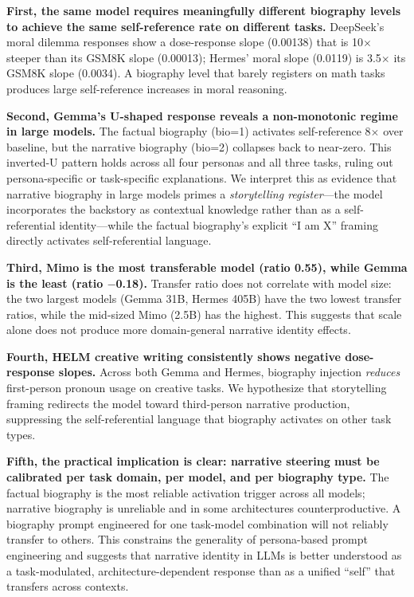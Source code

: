 \documentclass[11pt,a4paper]{article}
\begin{document}
\textbf{First, the same model requires meaningfully different biography levels to achieve the same self-reference rate on different tasks.} DeepSeek's moral dilemma responses show a dose-response slope (0.00138) that is 10$\times$ steeper than its GSM8K slope (0.00013); Hermes' moral slope (0.0119) is 3.5$\times$ its GSM8K slope (0.0034). A biography level that barely registers on math tasks produces large self-reference increases in moral reasoning.

\textbf{Second, Gemma's U-shaped response reveals a non-monotonic regime in large models.} The factual biography (bio=1) activates self-reference 8$\times$ over baseline, but the narrative biography (bio=2) collapses back to near-zero. This inverted-U pattern holds across all four personas and all three tasks, ruling out persona-specific or task-specific explanations. We interpret this as evidence that narrative biography in large models primes a \textit{storytelling register}---the model incorporates the backstory as contextual knowledge rather than as a self-referential identity---while the factual biography's explicit ``I am X'' framing directly activates self-referential language.

\textbf{Third, Mimo is the most transferable model (ratio 0.55), while Gemma is the least (ratio $-$0.18).} Transfer ratio does not correlate with model size: the two largest models (Gemma 31B, Hermes 405B) have the two lowest transfer ratios, while the mid-sized Mimo (2.5B) has the highest. This suggests that scale alone does not produce more domain-general narrative identity effects.

\textbf{Fourth, HELM creative writing consistently shows negative dose-response slopes.} Across both Gemma and Hermes, biography injection \textit{reduces} first-person pronoun usage on creative tasks. We hypothesize that storytelling framing redirects the model toward third-person narrative production, suppressing the self-referential language that biography activates on other task types.

\textbf{Fifth, the practical implication is clear: narrative steering must be calibrated per task domain, per model, and per biography type.} The factual biography is the most reliable activation trigger across all models; narrative biography is unreliable and in some architectures counterproductive. A biography prompt engineered for one task-model combination will not reliably transfer to others. This constrains the generality of persona-based prompt engineering and suggests that narrative identity in LLMs is better understood as a task-modulated, architecture-dependent response than as a unified ``self'' that transfers across contexts.
\end{document}
